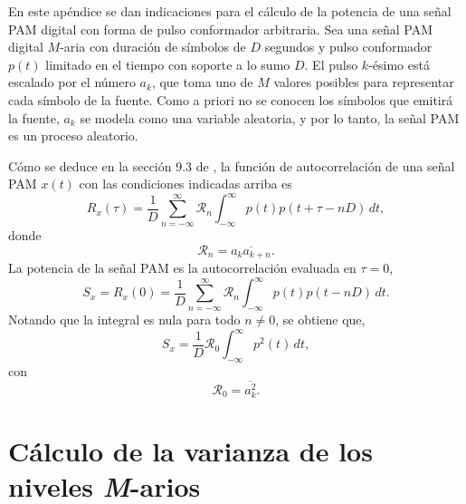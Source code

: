 \documentclass[a4paper]{article}
\begin{document}
En este apéndice se dan indicaciones para el cálculo de la potencia de una señal PAM digital con forma de pulso conformador arbitraria. Sea una señal PAM digital \(M\)-aria con duración de símbolos de \(D\) segundos y pulso conformador \(p(t)\) limitado en el tiempo con soporte a lo sumo \(D\). El pulso \(k\)-ésimo está escalado por el número \(a_k\), que toma uno de \(M\) valores posibles para representar cada símbolo de la fuente. Como a priori no se conocen los símbolos que emitirá la fuente, \(a_k\) se modela como una variable aleatoria, y por lo tanto, la señal PAM es un proceso aleatorio.

Cómo se deduce en la sección 9.3 de \cite{lathi1990modern4th}, la función de autocorrelación de una señal PAM \(x(t)\) con las condiciones indicadas arriba es
\[
 R_x(\tau)=\frac{1}{D}\sum_{n=-\infty}^{\infty}\mathcal{R}_n\int_{-\infty}^{\infty}p(t)p(t+\tau-nD)\,dt,
\]
donde
\[
 \mathcal{R}_n=\overline{a_ka_{k+n}}.
\]
La potencia de la señal PAM es la autocorrelación evaluada en \(\tau=0\),
\[
 S_x=R_x(0)=\frac{1}{D}\sum_{n=-\infty}^{\infty}\mathcal{R}_n\int_{-\infty}^{\infty}p(t)p(t-nD)\,dt.
\]
Notando que la integral es nula para todo \(n\neq0\), se obtiene que,
\[
 S_x=\frac{1}{D}\mathcal{R}_0\int_{-\infty}^{\infty}p^2(t)\,dt,
\]
con
\[
 \mathcal{R}_0=\overline{a_k^2}.
\]
 
\section{Cálculo de la varianza de los niveles \emph{M}-arios}\label{ap:m-ary_ak_square_mean}
\end{document}
